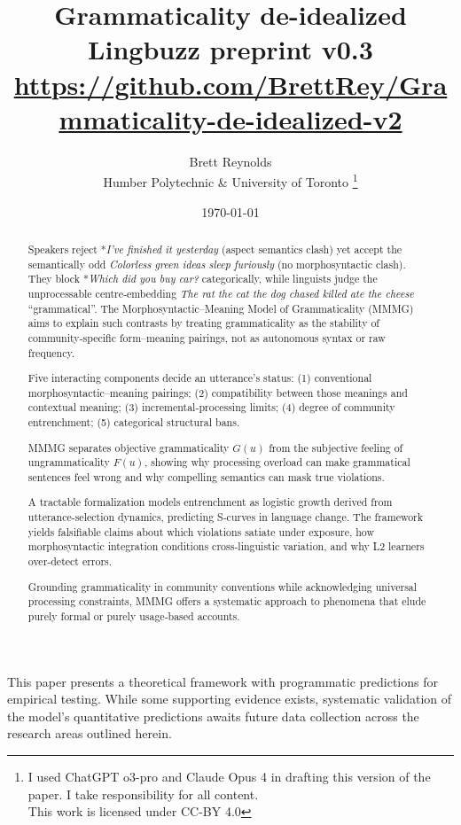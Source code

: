 \documentclass[12pt]{article}
\title{Grammaticality de-idealized\\[4pt]
       \large Lingbuzz preprint v0.3\\[6pt]
       \normalsize \url{https://github.com/BrettRey/Grammaticality-de-idealized-v2}}
\author{Brett Reynolds \orcidlink{0000-0003-0073-7195}\\Humber Polytechnic \& University of Toronto
\thanks{I used ChatGPT o3-pro and Claude Opus 4 in drafting this version of the paper. I take responsibility for all content. \\This work is licensed under CC-BY 4.0}}
\date{\today}
\begin{document}
\maketitle

\begin{abstract}
\small
Speakers reject *\textit{I've finished it yesterday} (aspect semantics clash) yet accept the semantically odd \textit{Colorless green ideas sleep furiously} (no morphosyntactic clash). They block *\textit{Which did you buy car?} categorically, while linguists judge the unprocessable centre‑embedding \textit{The rat the cat the dog chased killed ate the cheese} \enquote{grammatical}.  
The Morphosyntactic–Meaning Model of Grammaticality (MMMG) aims to explain such contrasts by treating grammaticality as the stability of community‑specific form–meaning pairings, not as autonomous syntax or raw frequency.

Five interacting components decide an utterance's status:  
(1) conventional morphosyntactic--meaning pairings;  
(2) compatibility between those meanings and contextual meaning;  
(3) incremental‑processing limits;  
(4) degree of community entrenchment;  
(5) categorical structural bans.

MMMG separates objective grammaticality \(G(u)\) from the subjective feeling of ungrammaticality \(F(u)\), showing why processing overload can make grammatical sentences feel wrong and why compelling semantics can mask true violations.  

A tractable formalization models entrenchment as logistic growth derived from utterance-selection dynamics, predicting S‑curves in language change. The framework yields falsifiable claims about which violations satiate under exposure, how morphosyntactic integration conditions cross‑linguistic variation, and why L2 learners over‑detect errors.  

Grounding grammaticality in community conventions while acknowledging universal processing constraints, MMMG offers a systematic approach to phenomena that elude purely formal or purely usage‑based accounts.
\end{abstract}

\begin{tcolorbox}[colback=lsLightBlue!20,title=Research Programme]
This paper presents a theoretical framework with programmatic predictions for empirical testing. While some supporting evidence exists, systematic validation of the model's quantitative predictions awaits future data collection across the research areas outlined herein.
\end{tcolorbox}
\end{document}
